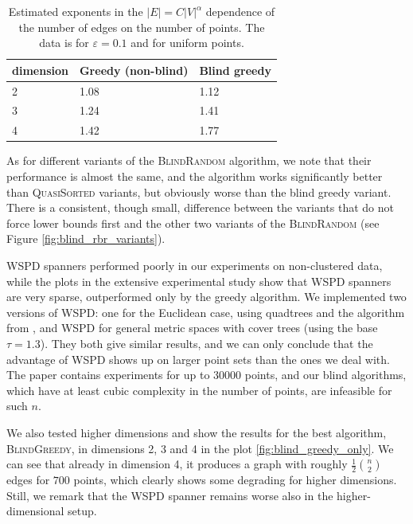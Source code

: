 \documentclass[a4paper,UKenglish,cleveref, autoref]{lipics-v2019}
\newcommand{\eps}{\varepsilon}
\begin{document}
\begin{table}[]
\begin{tabular}{|l|l|l|}
\hline
dimension & \textbf{Greedy (non-blind)} & \textbf{Blind greedy} \\ \hline
2         &         1.08                &  1.12                 \\ \hline
3         &         1.24                &  1.41                \\ \hline
4         &         1.42                &  1.77                 \\ \hline
\end{tabular}
\caption{Estimated exponents in the $|E|= C |V|^\alpha$ dependence of the number of edges
on the number of points. The data is for $\eps = 0.1$ and for uniform points.}
\label{tbl:regr_coeff_spanner}
\end{table}


As for different variants of the \textsc{BlindRandom} algorithm,
we note that their performance is almost the same, and the algorithm works
significantly better than \textsc{QuasiSorted} variants, but obviously
worse than the blind greedy variant. There is a consistent, though small,
difference between the variants that do not force lower bounds first and
the other two variants of the \textsc{BlindRandom} (see Figure \ref{fig:blind_rbr_variants}).



WSPD spanners performed poorly in our experiments
on non-clustered data, while the plots in the extensive experimental study \cite{farshi2009experimental}
show that WSPD spanners are very sparse, outperformed only by the greedy algorithm.
We implemented two versions of  WSPD: one for the Euclidean case,
using quadtrees and the algorithm from \cite{hp-book}, and WSPD for general metric
spaces with cover trees (using the base $\tau=1.3$). 
They both give similar results, and we can only conclude
that the advantage of WSPD shows up on larger point sets than the ones we deal with.
The paper \cite{farshi2009experimental} contains experiments for up to 30000 points,
and our blind algorithms, which have at least cubic complexity in the number of points,
are infeasible for such $n$.


We also tested higher dimensions and show the results for the best algorithm, \textsc{BlindGreedy},
in dimensions 2, 3 and 4 in the plot \ref{fig:blind_greedy_only}.
We can see that already in dimension 4, it produces a graph with roughly $\frac{1}{2}\binom{n}{2}$
edges for $700$ points, which clearly shows some degrading for higher dimensions. Still,
we remark that the WSPD spanner remains worse also in the higher-dimensional setup.
\end{document}
